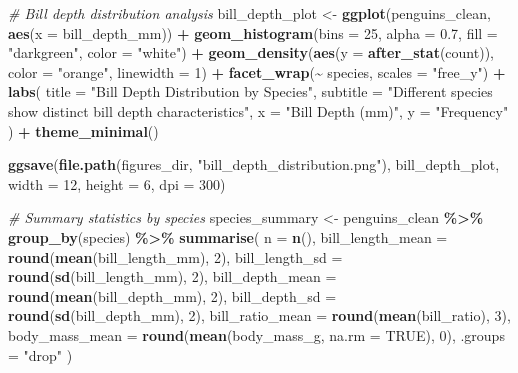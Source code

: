 \documentclass[
]{article}
\newenvironment{Shaded}{\begin{snugshade}}{\end{snugshade}}
\newcommand{\AttributeTok}[1]{\textcolor[rgb]{0.13,0.29,0.53}{#1}}
\newcommand{\CommentTok}[1]{\textcolor[rgb]{0.56,0.35,0.01}{\textit{#1}}}
\newcommand{\ConstantTok}[1]{\textcolor[rgb]{0.56,0.35,0.01}{#1}}
\newcommand{\DecValTok}[1]{\textcolor[rgb]{0.00,0.00,0.81}{#1}}
\newcommand{\FloatTok}[1]{\textcolor[rgb]{0.00,0.00,0.81}{#1}}
\newcommand{\FunctionTok}[1]{\textcolor[rgb]{0.13,0.29,0.53}{\textbf{#1}}}
\newcommand{\NormalTok}[1]{#1}
\newcommand{\OtherTok}[1]{\textcolor[rgb]{0.56,0.35,0.01}{#1}}
\newcommand{\SpecialCharTok}[1]{\textcolor[rgb]{0.81,0.36,0.00}{\textbf{#1}}}
\newcommand{\StringTok}[1]{\textcolor[rgb]{0.31,0.60,0.02}{#1}}
\begin{document}
\begin{Shaded}
\begin{Highlighting}[]
\CommentTok{\# Bill depth distribution analysis}
\NormalTok{bill\_depth\_plot }\OtherTok{\textless{}{-}} \FunctionTok{ggplot}\NormalTok{(penguins\_clean, }\FunctionTok{aes}\NormalTok{(}\AttributeTok{x =}\NormalTok{ bill\_depth\_mm)) }\SpecialCharTok{+}
  \FunctionTok{geom\_histogram}\NormalTok{(}\AttributeTok{bins =} \DecValTok{25}\NormalTok{, }\AttributeTok{alpha =} \FloatTok{0.7}\NormalTok{, }\AttributeTok{fill =} \StringTok{"darkgreen"}\NormalTok{, }\AttributeTok{color =} \StringTok{"white"}\NormalTok{) }\SpecialCharTok{+}
  \FunctionTok{geom\_density}\NormalTok{(}\FunctionTok{aes}\NormalTok{(}\AttributeTok{y =} \FunctionTok{after\_stat}\NormalTok{(count)), }\AttributeTok{color =} \StringTok{"orange"}\NormalTok{, }\AttributeTok{linewidth =} \DecValTok{1}\NormalTok{) }\SpecialCharTok{+}
  \FunctionTok{facet\_wrap}\NormalTok{(}\SpecialCharTok{\textasciitilde{}}\NormalTok{ species, }\AttributeTok{scales =} \StringTok{"free\_y"}\NormalTok{) }\SpecialCharTok{+}
  \FunctionTok{labs}\NormalTok{(}
    \AttributeTok{title =} \StringTok{"Bill Depth Distribution by Species"}\NormalTok{,}
    \AttributeTok{subtitle =} \StringTok{"Different species show distinct bill depth characteristics"}\NormalTok{,}
    \AttributeTok{x =} \StringTok{"Bill Depth (mm)"}\NormalTok{,}
    \AttributeTok{y =} \StringTok{"Frequency"}
\NormalTok{  ) }\SpecialCharTok{+}
  \FunctionTok{theme\_minimal}\NormalTok{()}

\FunctionTok{ggsave}\NormalTok{(}\FunctionTok{file.path}\NormalTok{(figures\_dir, }\StringTok{"bill\_depth\_distribution.png"}\NormalTok{),}
\NormalTok{       bill\_depth\_plot, }\AttributeTok{width =} \DecValTok{12}\NormalTok{, }\AttributeTok{height =} \DecValTok{6}\NormalTok{, }\AttributeTok{dpi =} \DecValTok{300}\NormalTok{)}

\CommentTok{\# Summary statistics by species}
\NormalTok{species\_summary }\OtherTok{\textless{}{-}}\NormalTok{ penguins\_clean }\SpecialCharTok{\%\textgreater{}\%}
  \FunctionTok{group\_by}\NormalTok{(species) }\SpecialCharTok{\%\textgreater{}\%}
  \FunctionTok{summarise}\NormalTok{(}
    \AttributeTok{n =} \FunctionTok{n}\NormalTok{(),}
    \AttributeTok{bill\_length\_mean =} \FunctionTok{round}\NormalTok{(}\FunctionTok{mean}\NormalTok{(bill\_length\_mm), }\DecValTok{2}\NormalTok{),}
    \AttributeTok{bill\_length\_sd =} \FunctionTok{round}\NormalTok{(}\FunctionTok{sd}\NormalTok{(bill\_length\_mm), }\DecValTok{2}\NormalTok{),}
    \AttributeTok{bill\_depth\_mean =} \FunctionTok{round}\NormalTok{(}\FunctionTok{mean}\NormalTok{(bill\_depth\_mm), }\DecValTok{2}\NormalTok{),}
    \AttributeTok{bill\_depth\_sd =} \FunctionTok{round}\NormalTok{(}\FunctionTok{sd}\NormalTok{(bill\_depth\_mm), }\DecValTok{2}\NormalTok{),}
    \AttributeTok{bill\_ratio\_mean =} \FunctionTok{round}\NormalTok{(}\FunctionTok{mean}\NormalTok{(bill\_ratio), }\DecValTok{3}\NormalTok{),}
    \AttributeTok{body\_mass\_mean =} \FunctionTok{round}\NormalTok{(}\FunctionTok{mean}\NormalTok{(body\_mass\_g, }\AttributeTok{na.rm =} \ConstantTok{TRUE}\NormalTok{), }\DecValTok{0}\NormalTok{),}
    \AttributeTok{.groups =} \StringTok{"drop"}
\NormalTok{  )}


\end{Highlighting}
\end{Shaded}
\end{document}
